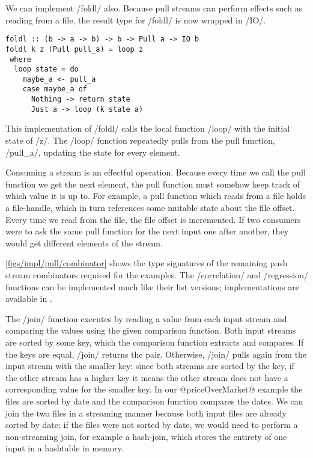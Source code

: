 We can implement \Hs/foldl/ also.
Because pull streams can perform effects such as reading from a file, the result type for \Hs/foldl/ is now wrapped in \Hs/IO/.

\begin{lstlisting}
foldl :: (b -> a -> b) -> b -> Pull a -> IO b
foldl k z (Pull pull_a) = loop z
 where
  loop state = do
    maybe_a <- pull_a
    case maybe_a of
      Nothing -> return state
      Just a -> loop (k state a)
\end{lstlisting}

This implementation of \Hs/foldl/ calls the local function \Hs/loop/ with the initial state of \Hs/z/.
The \Hs/loop/ function repeatedly pulls from the pull function, \Hs/pull_a/, updating the state for every element.

Consuming a stream is an effectful operation.
Because every time we call the pull function we get the next element, the pull function must somehow keep track of which value it is up to.
For example, a pull function which reads from a file holds a file-handle, which in turn references some mutable state about the file offset.
Every time we read from the file, the file offset is incremented.
If two consumers were to ask the same pull function for the next input one after another, they would get different elements of the stream.


\autoref{figs/impl/pull/combinator} shows the type signatures of the remaining push stream combinators required for the examples.
The \Hs/correlation/ and \Hs/regression/ functions can be implemented much like their list versions; implementations are available in .

The \Hs/join/ function executes by reading a value from each input stream and comparing the values using the given comparison function.
Both input streams are sorted by some key, which the comparison function extracts and compares.
If the keys are equal, \Hs/join/ returns the pair.
Otherwise, \Hs/join/ pulls again from the input stream with the smaller key: since both streams are sorted by the key, if the other stream has a higher key it means the other stream does not have a corresponding value for the smaller key.
In our @priceOverMarket@ example the files are sorted by date and the comparison function compares the dates.
We can join the two files in a streaming manner because both input files are already sorted by date; if the files were not sorted by date, we would need to perform a non-streaming join, for example a hash-join, which stores the entirety of one input in a hashtable in memory.


